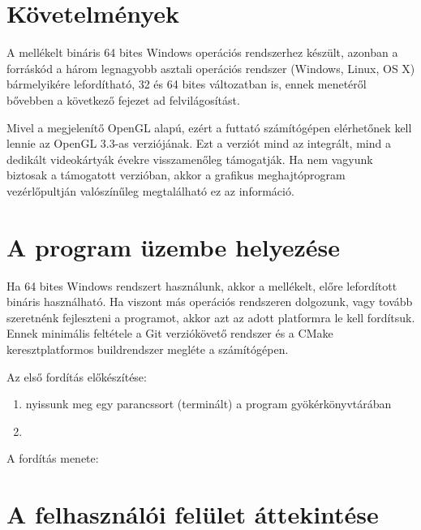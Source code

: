 
\section{Követelmények}

A mellékelt bináris 64 bites Windows operációs rendszerhez készült, azonban a forráskód a három legnagyobb asztali operációs rendszer (Windows, Linux, OS X) bármelyikére lefordítható, 32 és 64 bites változatban is, ennek menetéről bővebben a következő fejezet ad felvilágosítást.

Mivel a megjelenítő OpenGL alapú, ezért a futtató számítógépen elérhetőnek kell lennie az OpenGL 3.3-as verziójának. Ezt a verziót mind az integrált, mind a dedikált videokártyák évekre visszamenőleg támogatják. Ha nem vagyunk biztosak a támogatott verzióban, akkor a grafikus meghajtóprogram vezérlőpultján valószínűleg megtalálható ez az információ.

\section{A program üzembe helyezése}

Ha 64 bites Windows rendszert használunk, akkor a mellékelt, előre lefordított bináris használható. Ha viszont más operációs rendszeren dolgozunk, vagy tovább szeretnénk fejleszteni a programot, akkor azt az adott platformra le kell fordítsuk. Ennek minimális feltétele a Git verziókövető rendszer és a CMake keresztplatformos buildrendszer megléte a számítógépen.

Az első fordítás előkészítése:

\begin{enumerate}[noitemsep]
\item nyissunk meg egy parancssort (terminált) a program gyökérkönyvtárában
\item 
\end{enumerate}

A fordítás menete:

\section{A felhasználói felület áttekintése}

